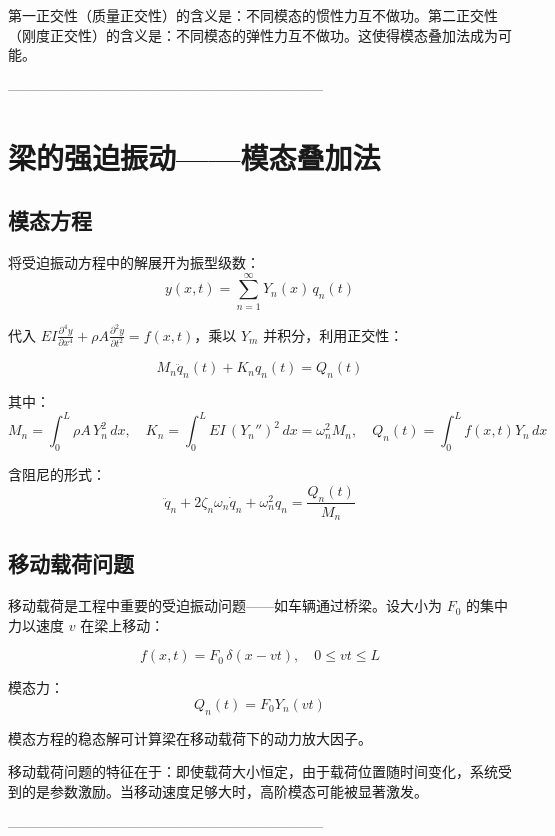 \begin{remark}
第一正交性（质量正交性）的含义是：不同模态的惯性力互不做功。第二正交性（刚度正交性）的含义是：不同模态的弹性力互不做功。这使得模态叠加法成为可能。
\end{remark}

--------------------------------------------------------------------
\section{梁的强迫振动——模态叠加法}

\subsection{模态方程}

将受迫振动方程中的解展开为振型级数：
\[
y(x,t) = \sum_{n=1}^{\infty} Y_n(x)\,q_n(t)
\]

代入 $EI\frac{\partial^4 y}{\partial x^4} + \rho A\frac{\partial^2 y}{\partial t^2} = f(x,t)$，乘以 $Y_m$ 并积分，利用正交性：

\begin{myformula}
\[
M_n \ddot{q}_n(t) + K_n q_n(t) = Q_n(t)
\]
\end{myformula}

其中：
\[
M_n = \int_0^L \rho A\,Y_n^2\,dx, \quad K_n = \int_0^L EI\,(Y_n'')^2\,dx = \omega_n^2 M_n, \quad Q_n(t) = \int_0^L f(x,t)Y_n\,dx
\]

含阻尼的形式：
\[
\ddot{q}_n + 2\zeta_n\omega_n \dot{q}_n + \omega_n^2 q_n = \frac{Q_n(t)}{M_n}
\]

\subsection{移动载荷问题}

移动载荷是工程中重要的受迫振动问题——如车辆通过桥梁。设大小为 $F_0$ 的集中力以速度 $v$ 在梁上移动：

\[
f(x,t) = F_0\,\delta(x - vt), \quad 0 \leq vt \leq L
\]

模态力：
\[
Q_n(t) = F_0 Y_n(vt)
\]

模态方程的稳态解可计算梁在移动载荷下的动力放大因子。

\begin{remark}
移动载荷问题的特征在于：即使载荷大小恒定，由于载荷位置随时间变化，系统受到的是参数激励。当移动速度足够大时，高阶模态可能被显著激发。
\end{remark}

--------------------------------------------------------------------
